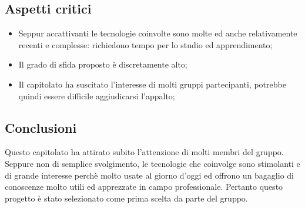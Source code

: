 \subsection{Aspetti critici}
\begin{itemize}
\item Seppur accattivanti le tecnologie coinvolte sono molte ed anche relativamente recenti e complesse: richiedono tempo per lo studio ed apprendimento;
\item Il grado di sfida proposto è discretamente alto;
\item Il capitolato ha suscitato l'interesse di molti gruppi partecipanti, potrebbe quindi essere difficile aggiudicarsi l'appalto;
\end{itemize}

\subsection{Conclusioni}
Questo capitolato ha attirato subito l'attenzione di molti membri del gruppo. Seppure non di semplice svolgimento, le tecnologie che coinvolge sono stimolanti e di grande interesse perchè molto usate al giorno d'oggi ed offrono un bagaglio di conoscenze molto utili ed apprezzate in campo professionale. Pertanto questo progetto è stato selezionato come prima scelta da parte del gruppo.
